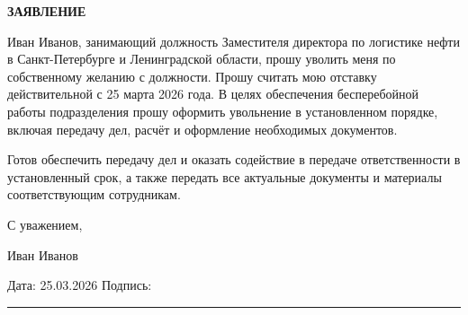 \documentclass[12pt]{article}
\begin{document}
\begin{center}
\textbf{\LARGE ЗАЯВЛЕНИЕ}
\end{center}

\vspace{1cm}




Иван Иванов, занимающий должность Заместителя директора по логистике нефти в Санкт-Петербурге и Ленинградской области, прошу уволить меня по собственному желанию с должности. Прошу считать мою отставку действительной с 25 марта 2026 года. В целях обеспечения бесперебойной работы подразделения прошу оформить увольнение в установленном порядке, включая передачу дел, расчёт и оформление необходимых документов.

Готов обеспечить передачу дел и оказать содействие в передаче ответственности в установленный срок, а также передать все актуальные документы и материалы соответствующим сотрудникам.

С уважением,

Иван Иванов


\vfill

\noindent
Дата: 25.03.2026 \hfill Подпись: \rule{5cm}{0.4pt}
\end{document}
